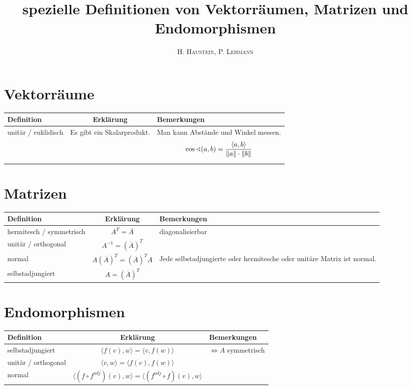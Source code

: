 \documentclass[ngerman,a4paper]{article}
\title{\textbf{spezielle Definitionen von Vektorräumen, Matrizen und Endomorphismen}}
\author{\textsc{H. Haustein}, \textsc{P. Lehmann}}
\begin{document}
	\maketitle

\section{Vektorräume}
	\begin{tabularx}{\textwidth}{l|c|X}
		\textbf{Definition} & \textbf{Erklärung} & \textbf{Bemerkungen} \\
		\hline
		unitär / euklidisch & Es gibt ein Skalarprodukt. & Man kann Abstände und Winkel messen. \begin{align}
			\cos\sphericalangle(a,b)=\frac{\langle a,b\rangle}{\Vert a\Vert\cdot\Vert b\Vert}\notag
		\end{align}
	\end{tabularx}

\section{Matrizen}
	\begin{tabularx}{\textwidth}{l|c|X}
		\textbf{Definition} & \textbf{Erklärung} & \textbf{Bemerkungen} \\
		\hline
		hermitesch / symmetrisch & $A^T = \overline{A}$ & diagonalisierbar \\
		unitär / orthogonal & $A^{-1} = (\overline{A})^T$ & \\
		normal & $A(\overline{A})^T = (\overline{A})^TA$ & Jede selbstadjungierte oder hermitesche oder unitäre Matrix ist normal. \\
		selbstadjungiert & $A = (\overline{A})^T$ & \\
	\end{tabularx}

\section{Endomorphismen}
	\begin{tabularx}{\textwidth}{l|c|X}
		\textbf{Definition} & \textbf{Erklärung} & \textbf{Bemerkungen} \\
		\hline
		selbstadjungiert & $\langle f(v),w\rangle = \langle v,f(w)\rangle$ & $\Leftrightarrow A$ symmetrisch \\
		unitär / orthogonal & $\langle v,w\rangle = \langle f(v),f(w)\rangle$ & \\
		normal & $\langle (f\circ f^{adj})(v),w\rangle = \langle (f^{adj}\circ f)(v),w\rangle$ &
	\end{tabularx}
\end{document}
